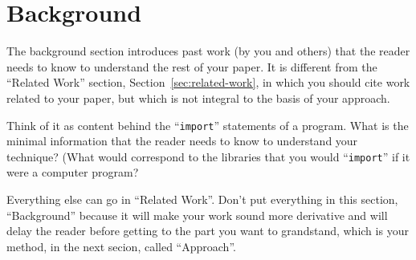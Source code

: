 \section{Background}
\label{sec:background}

The background section introduces past work (by you
and others) that the reader needs to know to understand
the rest of your paper.
%
It is different from the ``Related Work'' section,
Section~\ref{sec:related-work},
in which you should cite work related to your paper,
but which is not integral to the basis of your approach.

Think of it as content behind the ``{\tt import}'' statements 
of a program. What is the minimal information that the reader 
needs to know to understand your technique? (What would 
correspond to the libraries that you would ``{\tt import}'' 
if it were a computer program?

Everything else can go in ``Related Work''. Don't put everything 
in this section, ``Background'' because it will make your
work sound more derivative and will delay the reader
before getting to the part you want to grandstand, 
which is your method, in the next secion, called 
``Approach''.





